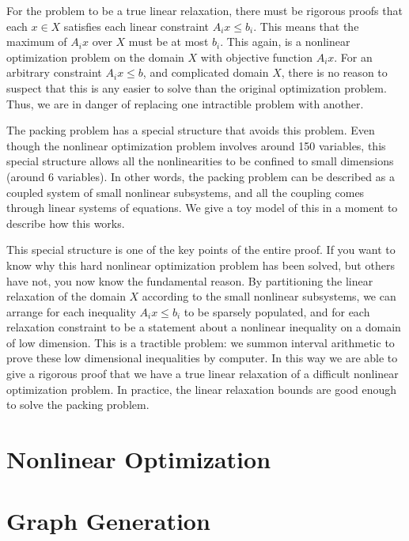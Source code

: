 For the problem to be a true linear relaxation, there must be rigorous
proofs that each $x\in X$ satisfies each linear constraint $A_i x\le
b_i$.  This means that the maximum of $A_i x$ over $X$ must be at most
$b_i$.  This again, is a nonlinear optimization problem on the domain
$X$ with objective function $A_i x$.  For an arbitrary constraint $A_i
x\le b$, and complicated domain $X$, there is no reason to suspect
that this is any easier to solve than the original optimization
problem.  Thus, we are in danger of replacing one intractible problem
with another.

The packing problem has a special structure that avoids this
problem.  Even though the nonlinear optimization problem involves
around 150 variables, 
this special structure allows all the nonlinearities to 
be confined to small dimensions (around 6 variables).  In other words,
the packing problem can be
described as a coupled system of small nonlinear subsystems,
and all the coupling comes through linear systems of equations. 
We give a toy model of this in a moment to describe how this works.

This special structure is one of the key points of the entire proof.
If you want to know why this hard nonlinear optimization problem has
been solved, but others have not, you now know the fundamental reason.
By partitioning the linear relaxation of the domain $X$ according
to the small nonlinear subsystems, we can arrange for each inequality
$A_i x\le b_i$ to be sparsely populated, and for each relaxation
constraint to be a statement about a nonlinear inequality on a domain
of low dimension.  This is a tractible problem:
we  summon interval arithmetic to prove these
low dimensional inequalities by computer.  In this way we are able
to give a rigorous proof that we have a true linear relaxation of a
difficult nonlinear optimization problem.  In practice, the linear
relaxation  bounds  are good enough to solve the packing
problem.







\section{Nonlinear Optimization}

\section{Graph Generation}

